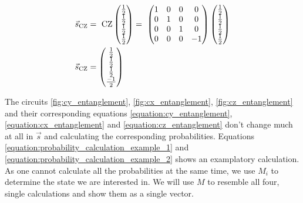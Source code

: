 \begin{equation}
    \centering
    \begin{split}
        \vec{s}_{\mathrm{CZ}} &=\ \mathrm{CZ}\begin{pmatrix}
            \frac{1}{2}\\\frac{1}{2}\\\frac{1}{2}\\\frac{1}{2}
        \end{pmatrix} =\  \begin{pmatrix}
        1 & 0 & 0 & 0 \\
        0 & 1 & 0 & 0 \\
        0 & 0 & 1 & 0 \\
        0 & 0 & 0 & -1
    \end{pmatrix}\begin{pmatrix}
            \frac{1}{2}\\\frac{1}{2}\\\frac{1}{2}\\\frac{1}{2}
        \end{pmatrix} \\
        \vec{s}_{\mathrm{CZ}} &= \begin{pmatrix}
            \frac{1}{2}\\\frac{1}{2}\\\frac{1}{2}\\\frac{-1}{2}
        \end{pmatrix}
    \end{split}
    \label{equation:cz_entanglement}
\end{equation}

The circuits \ref{fig:cy_entanglement}, \ref{fig:cx_entanglement}, \ref{fig:cz_entanglement} and their corresponding equations \ref{equation:cy_entanglement}, \ref{equation:cx_entanglement} and \ref{equation:cz_entanglement} don't change much at all in $\vec{s}$ and calculating the corresponding probabilities. Equations \ref{equation:probability_calculation_example_1} and \ref{equation:probability_calculation_example_2} shows an examplatory calculation. As one cannot calculate all the probabilities at the same time, we use $M_i$ to determine the state we are interested in. We will use $M$ to resemble all four, single calculations and show them as a single vector.

